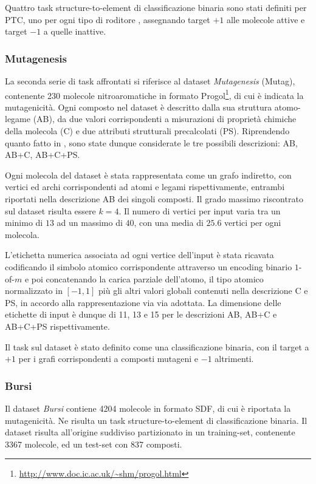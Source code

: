 Quattro task structure-to-element di classificazione binaria sono stati definiti per PTC, uno per ogni tipo di roditore \cite{Frohlich:OptimalAssignment}, assegnando target $+1$ alle molecole attive e target $-1$ a quelle inattive.

\subsubsection*{Mutagenesis}\label{sec:esperimenti:dataset:mutag}
La seconda serie di task affrontati si riferisce al dataset \emph{Mutagenesis} \cite{Srinivasan:Mutagenesis} (Mutag), contenente 230 molecole nitroaromatiche in formato Progol\footnote{\url{http://www.doc.ic.ac.uk/~shm/progol.html}}, di cui è indicata la mutagenicità.
Ogni composto nel dataset è descritto dalla sua struttura atomo-legame (AB), da due valori corrispondenti a misurazioni di proprietà chimiche della molecola (C) e due attributi strutturali precalcolati (PS). Riprendendo quanto fatto in \cite{Gallicchio:GraphESN}, sono state dunque considerate le tre possibili descrizioni: AB, AB+C, AB+C+PS.

Ogni molecola del dataset è stata rappresentata come un grafo indiretto, con vertici ed archi corrispondenti ad atomi e legami rispettivamente, entrambi riportati nella descrizione AB dei singoli composti. Il grado massimo riscontrato sul dataset risulta essere $k = 4$. Il numero di vertici per input varia tra un minimo di $13$ ad un massimo di $40$, con una media di $25.6$ vertici per ogni molecola.

L'etichetta numerica associata ad ogni vertice dell'input è stata ricavata codificando il simbolo atomico corrispondente attraverso un encoding binario $1$-of-$m$ e poi concatenando la carica parziale dell'atomo, il tipo atomico normalizzato in $[-1,1]$ più gli altri valori globali contenuti nella descrizione C e PS, in accordo alla rappresentazione via via adottata. La dimensione delle etichette di input è dunque di 11, 13 e 15 per le descrizioni AB, AB+C e AB+C+PS rispettivamente.

Il task sul dataset è stato definito come una classificazione binaria, con il target a $+1$ per i grafi corrispondenti a composti mutageni e $-1$ altrimenti.



\subsubsection*{Bursi}\label{sec:esperimenti:dataset:bursi}
Il dataset \emph{Bursi} \cite{Kazius:Bursi,Ferrari:AnOpenSource} contiene 4204 molecole in formato SDF, di cui è riportata la mutagenicità. Ne risulta un task structure-to-element di classificazione binaria.
Il dataset risulta all'origine suddiviso partizionato in un training-set, contenente 3367 molecole, ed un test-set con 837 composti.

